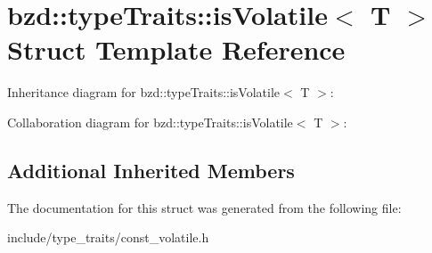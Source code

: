 \hypertarget{structbzd_1_1typeTraits_1_1isVolatile}{}\section{bzd\+:\+:type\+Traits\+:\+:is\+Volatile$<$ T $>$ Struct Template Reference}
\label{structbzd_1_1typeTraits_1_1isVolatile}


Inheritance diagram for bzd\+:\+:type\+Traits\+:\+:is\+Volatile$<$ T $>$\+:


Collaboration diagram for bzd\+:\+:type\+Traits\+:\+:is\+Volatile$<$ T $>$\+:
\subsection*{Additional Inherited Members}


The documentation for this struct was generated from the following file\+:\begin{DoxyCompactItemize}
\item 
include/type\+\_\+traits/const\+\_\+volatile.\+h\end{DoxyCompactItemize}
